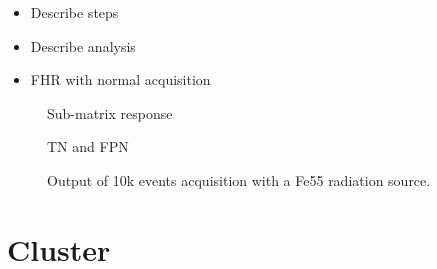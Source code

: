   \begin{itemize} 
    \item Describe steps
    \item Describe analysis
    \item FHR with normal acquisition
  \end{itemize}

  \begin{figure}
    \caption{Sub-matrix response}
  \end{figure}

  \begin{figure}
    \caption{TN and FPN}
  \end{figure}

  \begin{figure}
    \caption{Output of 10k events acquisition with a Fe55 radiation source.}
  \end{figure}

\section{Cluster}
